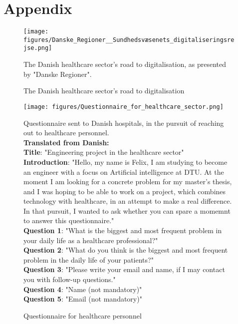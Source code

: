 \section{Appendix}

\begin{figure}[H]
    \centering
    \texttt{[image: figures/Danske\_Regioner\_\_Sundhedsvæsenets\_digitaliseringsrejse.png]}
    \caption{The Danish healthcare sector's road to digitalisation}
    \medskip
    \small
    The Danish healthcare sector's road to digitalisation, as presented by "Danske Regioner"\cite{Den-Reg-digitalisation}.
    \label{fig:healthcare_digitalisation}
\end{figure}

\begin{figure}[H]
    \centering
    \texttt{[image: figures/Questionnaire\_for\_healthcare\_sector.png]}
    \caption{Questionnaire for healthcare personnel}
    \medskip
    \small
    Questionnaire sent to Danish hospitals, in the pursuit of reaching out to healthcare personnel.
    \\
    \textbf{Translated from Danish:}
    \\
    \textbf{Title}: "Engineering project in the healthcare sector"
    \\
    \textbf{Introduction}: "Hello, my name is Felix, I am studying to become an engineer with a focus on Artificial intelligence at DTU. At the moment I am looking for a concrete problem for my master's thesis, and I was hoping to be able to work on a project, which combines technology with healthcare, in an attempt to make a real difference. In that pursuit, I wanted to ask whether you can spare a momemnt to answer this questionnaire." 
    \\
    \textbf{Question 1}: "What is the biggest and most frequent problem in your daily life as a healthcare professional?"
    \\
    \textbf{Question 2}: "What do you think is the biggest and most frequent problem in the daily life of your patients?"
    \\
    \textbf{Question 3}: "Please write your email and name, if I may contact you with follow-up questions."
    \\
    \textbf{Question 4}: "Name (not mandatory)"
    \\
    \textbf{Question 5}: "Email (not mandatory)"
    \label{fig:questionnaire_healthcare_personnel}
\end{figure}